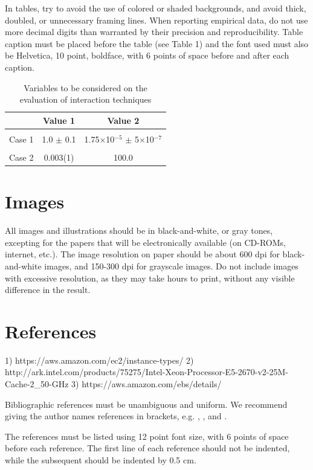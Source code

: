 \documentclass[12pt]{article}
\begin{document}
In tables, try to avoid the use of colored or shaded backgrounds, and avoid
thick, doubled, or unnecessary framing lines. When reporting empirical data,
do not use more decimal digits than warranted by their precision and
reproducibility. Table caption must be placed before the table (see Table 1)
and the font used must also be Helvetica, 10 point, boldface, with 6 points of
space before and after each caption.

\begin{table}[ht]
\centering
\caption{Variables to be considered on the evaluation of interaction
  techniques}
\label{tab:exTable1}
\smallskip
\begin{tabular}{|l|c|c|}
\hline
& Value 1 & Value 2\\[0.5ex]
\hline
&&\\[-2ex]
Case 1 & 1.0 $\pm$ 0.1 & 1.75$\times$10$^{-5}$ $\pm$ 5$\times$10$^{-7}$\\[0.5ex]
\hline
&&\\[-2ex]
Case 2 & 0.003(1) & 100.0\\[0.5ex]
\hline
\end{tabular}
\end{table}

\section{Images}

All images and illustrations should be in black-and-white, or gray tones,
excepting for the papers that will be electronically available (on CD-ROMs,
internet, etc.). The image resolution on paper should be about 600 dpi for
black-and-white images, and 150-300 dpi for grayscale images.  Do not include
images with excessive resolution, as they may take hours to print, without any
visible difference in the result. 

\section{References}

1) https://aws.amazon.com/ec2/instance-types/
2) http://ark.intel.com/products/75275/Intel-Xeon-Processor-E5-2670-v2-25M-Cache-2_50-GHz
3) https://aws.amazon.com/ebs/details/

Bibliographic references must be unambiguous and uniform.  We recommend giving
the author names references in brackets, e.g. \cite{knuth:84},
\cite{boulic:91}, and \cite{smith:99}.

The references must be listed using 12 point font size, with 6 points of space
before each reference. The first line of each reference should not be
indented, while the subsequent should be indented by 0.5 cm.



\end{document}
